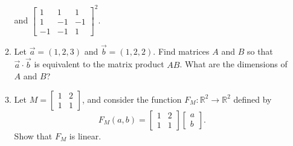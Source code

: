 \documentclass[letter]{article}
\newcommand{\R}{\mathbb{R}}
\newcommand{\mat}[1]{\begin{bmatrix}#1\end{bmatrix}}
\begin{document}
\begin{enumerate}
\begin{enumerate}
				and $\mat{1&1&1\\1&-1&-1\\-1&-1&1}^2$.
			\item Let $\vec a=(1,2,3)$ and $\vec b=(1,2,2)$.  Find matrices $A$ and $B$
				so that $\vec a\cdot \vec b$ is equivalent to the matrix product $AB$.
				What are the dimensions of $A$ and $B$?
			\item Let $M=\mat{1&2\\1&1}$, and consider the function $F_M:\R^2\to \R^2$ defined by 
				\[
					F_M(a,b) = \mat{1&2\\1&1}\mat{a\\ b}.
				\]
				Show that $F_M$ is linear.
		\end{enumerate}

	\end{enumerate}
\end{document}
